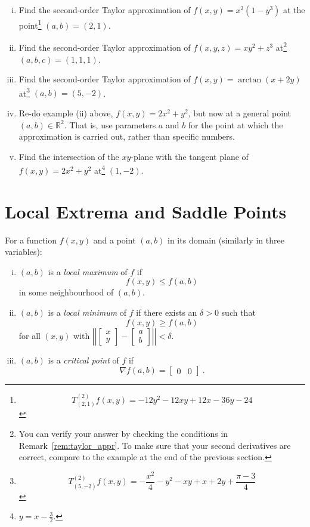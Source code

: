 \begin{exercise}
\begin{enumerate}[(i)]
	\item Find the second-order Taylor approximation of $f(x,y)=x^2(1-y^3)$ at the point\footnote{
	\[ T_{(2,1)}^{(2)}f(x,y) = -12y^2-12xy+12x-36y-24 \]}
	$(a,b)=(2,1)$.
	\item Find the second-order Taylor approximation of $f(x,y,z)=xy^2+z^3$ at\footnote{You can verify your answer by checking the conditions in Remark~\ref{rem:taylor_appr}. To make sure that your second derivatives are correct, compare to the example at the end of the previous section.} $(a,b,c)=(1,1,1)$.
	\item Find the second-order Taylor approximation of $f(x,y)=\arctan(x+2y)$ at\footnote{
	\[ T_{(5,-2)}^{(2)}f(x,y) = -\frac{x^2}{4}-y^2-xy+x+2y+\frac{\pi-3}{4}\]}
	$(a,b)=(5,-2)$.
	\item Re-do example (ii) above, $f(x,y)=2x^2+y^2$, but now at a general point $(a,b)\in\mathbb{R}^2$. That is, use parameters $a$ and $b$ for the point at which the approximation is carried out, rather than specific numbers.
	\item Find the intersection of the $xy$-plane with the tangent plane of $f(x,y)=2x^2+y^2$ at\footnote{$y=x-\tfrac32.$} $(1,-2)$.
\end{enumerate}
\end{exercise}
	
	
\section{Local Extrema and Saddle Points}

\begin{definition}
For a function $f(x,y)$ and a point $(a,b)$ in its domain (similarly in three variables):
\begin{enumerate}[(i)]
	\item $(a,b)$ is a \emph{local maximum} of $f$ if 
	\[ f(x,y) \leq f(a,b) \]
	in some neighbourhood of $(a,b)$.
	\item $(a,b)$ is a \emph{local minimum} of $f$ if there exists an $\delta > 0$ such that
	\[ f(x,y) \geq f(a,b) \]
	for all $(x,y)$ with $\left|\left|\begin{bmatrix} x \\ y \end{bmatrix}
							   -\begin{bmatrix} a \\ b \end{bmatrix}\right|\right|<\delta$.
	\item $(a,b)$ is a \emph{critical point} of $f$ if 
	\[ \nabla f (a,b) = \begin{bmatrix} 0 & 0 \end{bmatrix} \:. \]
\end{enumerate}
\end{definition}

